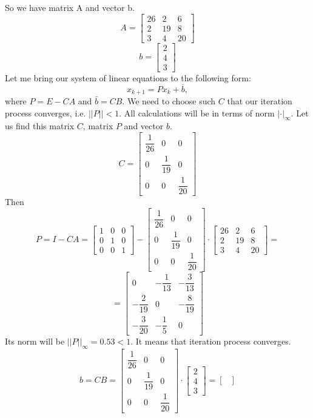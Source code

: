 \documentclass[12pt]{report}
\begin{document}
\begin{solution}
   So we have matrix A and vector b.
   \[ 
      A = \begin{bmatrix}
         26 & 2 & 6\\
         2 & 19 & 8\\
          3 & 4 & 20\end{bmatrix}
   \]
   \[ 
      b = \begin{bmatrix}2\\4\\3\end{bmatrix}
   \]
   Let me bring our system of linear equations to the following form:
   \[
         x_{k+1} = Px_k + \overline{b},
   \]
   where $P=E-CA$ and $\bar b = CB$.  
   We need to choose such $C$ that our iteration process converges, i.e. $||P||<1$.  
   All calculations will be in terms of norm $|\cdot|_{\infty}$.
   Let us find this matrix $C$, matrix $P$ and vector $b$.  
   \[ C = \begin{bmatrix}\dfrac{1}{26} & 0 & 0\\0 & \dfrac{1}{19} & 0\\ 0 & 0 & \dfrac{1}{20}\end{bmatrix} 
   \]
   Then
   \[ P = I-CA = \begin{bmatrix} 1 & 0 & 0\\0 & 1 & 0\\ 0 & 0 & 1\end{bmatrix}-\begin{bmatrix}\dfrac{1}{26} & 0 & 0\\0 & \dfrac{1}{19} & 0\\ 0 & 0 & \dfrac{1}{20}\end{bmatrix}\cdot\begin{bmatrix} 26 & 2 & 6\\2 & 19 & 8\\ 3 & 4 & 20\end{bmatrix} = \]
   \[
         =\begin{bmatrix}
            0 & - \dfrac{1}{13} & - \dfrac{3}{13} \\[0.5cm]
            -\dfrac{2}{19} & 0 & -\dfrac{8}{19} \\[0.5cm] 
            -\dfrac{3}{20} & -\dfrac{1}{5} & 0
         \end{bmatrix}
   \]
   Its norm will be $||P||_{\infty}=0.53<1$. It means that iteration process converges.  
   \[b = CB = \begin{bmatrix}\dfrac{1}{26} & 0 & 0\\0 & \dfrac{1}{19} & 0\\ 0 & 0 & \dfrac{1}{20}\end{bmatrix} \cdot \begin{bmatrix}2\\4\\3\end{bmatrix}= \begin{bmatrix}

\end{bmatrix}\]
\end{solution}
\end{document}
